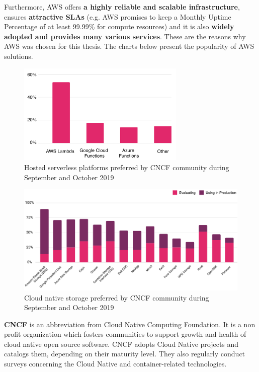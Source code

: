 Furthermore, AWS offers \textbf{a highly reliable and scalable infrastructure}\cite{article-aws-architecting}, ensures \textbf{attractive SLAs} (e.g. AWS promises to keep a Monthly Uptime Percentage of at least 99.99\% for compute resources)\cite{online-aws-sla} and it is also \textbf{widely adopted and provides many various services}\cite{cncf-2019}. These are the reasons why AWS was chosen for this thesis. The charts below present the popularity of AWS solutions.

\begin{figure}[H]
    \centering
    \includegraphics[width=8cm]{figures/cncf-aws-pop1.png}
    \captionsetup{justification=centering,margin=2cm}
    \caption{Hosted serverless platforms preferred by CNCF community during September and October 2019\cite{cncf-2019}}
\end{figure}
\begin{figure}[H]
    \centering
    \includegraphics[width=13cm]{figures/cncf-aws-pop2.png}
    \captionsetup{justification=centering,margin=2cm}
    \caption{Cloud native storage preferred by CNCF community during September and October 2019\cite{cncf-2019}}
\end{figure}

\textbf{CNCF} is an abbreviation from Cloud Native Computing Foundation. It is a non profit organization which fosters communities to support growth and health of cloud native open source software. CNCF adopts Cloud Native projects and catalogs them, depending on their maturity level. They also regularly conduct surveys concerning the Cloud Native and container-related technologies\cite{cncf-services}.



